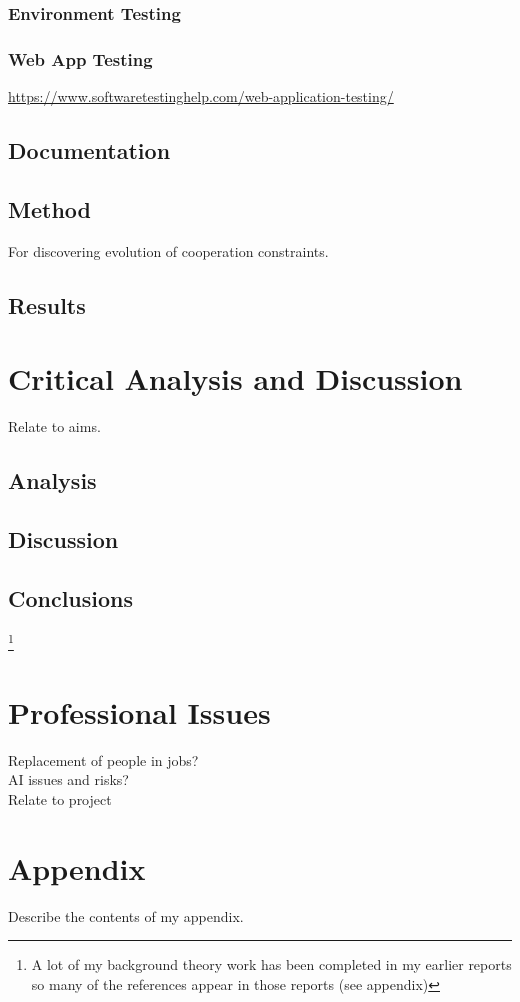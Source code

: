 \documentclass[]{final_report}
\begin{document}
\subsection{Environment Testing}

\subsection{Web App Testing}
\url{https://www.softwaretestinghelp.com/web-application-testing/}

\section{Documentation}

\section{Method}
For discovering evolution of cooperation constraints.

\section{Results}


\chapter{Critical Analysis and Discussion}
Relate to aims.
\section{Analysis}

\section{Discussion}

\section{Conclusions}

\newpage
{}

\footnote{A lot of my background theory work has been completed in my earlier reports so many of the references appear in those reports (see appendix)}
\label{endpage}

\chapter{Professional Issues}
Replacement of people in jobs?\\
AI issues and risks?\\
Relate to project

\chapter{Appendix}
\label{appendix}
Describe the contents of my appendix.






\end{document}
